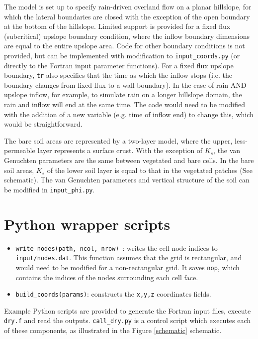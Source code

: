 \documentclass{article}
\newcommand{\code}[1]{\texttt{#1}}
\begin{document}
The model is set up to specify rain-driven overland flow on a planar hillslope, for which the lateral boundaries are closed with the exception of the open boundary at the bottom of the hillslope.  Limited support is provided for a fixed flux (subcritical) upslope boundary condition,  where the inflow boundary dimensions are equal to the entire upslope area.  Code for other boundary conditions is not provided, but can be implemented with modification to \code{input\_coords.py} (or directly to the Fortran input parameter functions).
For a fixed flux upslope boundary, \code{tr} also specifies that the time as which the inflow stops (i.e. the boundary changes from fixed flux to a wall boundary).  In the case of rain AND upslope inflow, for example, to simulate rain on a longer hillslope domain, the rain and inflow will end at the same time. The code would need to be modified with the addition of a new variable (e.g. time of inflow end) to change this, which would be straightforward. 

The bare soil areas are represented by a two-layer model, where the upper, less-permeable  layer represents a surface crust.  With the exception of $K_{s}$, the van Genuchten parameters are the same between vegetated and bare cells. In the bare soil areas, $K_{s}$ of the lower soil layer is  equal to that in the vegetated patches (See schematic).
The van Genuchten parameters and vertical structure of the soil can be modified in \code{input\_phi.py}.


\section{Python wrapper scripts}
\label{python_wrap}

\begin{itemize}
\item \code{write\_nodes(path, ncol, nrow)  }: writes the cell node indices to \code{input/nodes.dat}.  
    This function assumes that the grid is rectangular, and would need to be modified for a non-rectangular grid. 
       It saves \code{nop}, which contains the indices of the nodes surrounding each cell face.
\item \code{build\_coords(params)}: constructs the \code{x,y,z} coordinates fields. 
\end{itemize}



Example Python scripts are provided to generate the Fortran input files, execute \code{dry.f} and read the outputs.   \code{call\_dry.py} is a control script which executes each of these components, as illustrated in the Figure \ref{schematic} schematic.
\end{document}
